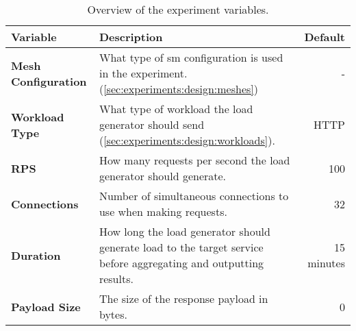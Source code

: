 \begin{table*}[!t]
\centering

\begin{tabularx}{\textwidth}{l X r}

\toprule
\textbf{Variable}    &
\textbf{Description} &
\textbf{Default}     \\
\toprule

\textbf{Mesh Configuration} &
What type of \gls{sm} configuration is used in the experiment. (\cref{sec:experiments:design:meshes}) &
- \\

\textbf{Workload Type} &
What type of workload the load generator should send (\cref{sec:experiments:design:workloads}). &
HTTP \\

\textbf{RPS} &
How many requests per second the load generator should generate. &
100 \\

\textbf{Connections} &
Number of simultaneous connections to use when making requests. &
32 \\

\textbf{Duration} &
How long the load generator should generate load to the target service before aggregating and outputting results. &
15 minutes \\

\textbf{Payload Size} &
The size of the response payload in bytes. &
0 \\

\bottomrule

\end{tabularx}

\caption[Overview of the experiment variables.]{Overview of the experiment variables.}
\label{tab:experiment:design:exp-variables}
\end{table*}
